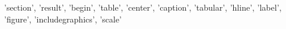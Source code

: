 {'section', 'result', 'begin', 'table', 'center', 'caption', 'tabular', 'hline', 'label', 'figure', 'includegraphics', 'scale'}
